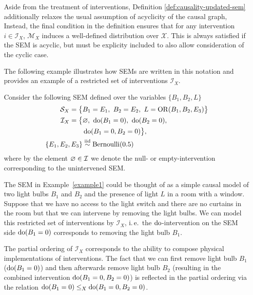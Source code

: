 Aside from the treatment of interventions, Definition \ref{def:causality-updated-sem} additionally relaxes the usual assumption of acyclicity of the causal graph, 
Instead, the final condition in the definition ensures that for any intervention ${i \in \mathcal{I}_X}$, $\mathcal{M}_X$ induces a well-defined distribution over $\mathcal{X}$. 
This is always satisfied if the SEM is acyclic, but must be explicity included to also allow consideration of the cyclic case.

The following example illustrates how SEMs are written in this notation and provides an example of a restricted set of interventions $\mathcal{I}_X$.

\medskip

\begin{example}\label{example1}
Consider the following SEM defined over the variables $\{ B_1,B_2,L \}$
%
\begin{align*}
\mathcal{S}_X = \big\{ & B_1 = E_1,\ B_2 = E_2,\ L = \operatorname{OR}(B_1,B_2,E_3) \big\} \\
%
\mathcal{I}_X = \big\{ & \nulli,\ \doop(B_1=0),\ \doop(B_2=0),\\
& \doop(B_1=0,B_2=0) \big\}, \\
%
\{ E_1,E_2,E_3 \} & \overset{\text{iid}}{\sim} \mathrm{Bernoulli}(0.5)
\end{align*}
%
where by the element $\varnothing \in \mathcal{I}$ we denote the null- or empty-intervention corresponding to the unintervened SEM\@.
\end{example}

The SEM in Example~\ref{example1} could be thought of as a simple causal model of two light bulbs $B_1$ and $B_2$ and the presence of light $L$ in a room with a window.
Suppose that we have no access to the light switch and there are no curtains in the room but that we can intervene by removing the light bulbs.
We can model this restricted set of interventions by $\mathcal{I}_X$, i.\,e.\ the $\operatorname{do}$-intervention on the SEM side ${\operatorname{do}(B_1=0)}$  corresponds to removing the light bulb $B_1$.

The partial ordering of $\mathcal{I}_X$ corresponds to the ability to compose physical implementations of interventions. The fact that we can first remove light bulb $B_1$ (${\operatorname{do}(B_1=0)}$) and then afterwards remove light bulb $B_2$ (resulting in the combined intervention ${\operatorname{do}(B_1=0, B_2=0)}$)  is reflected in the partial ordering via the relation ${\operatorname{do}(B_1=0) \leq_X \operatorname{do}(B_1=0,B_2=0)}$.

